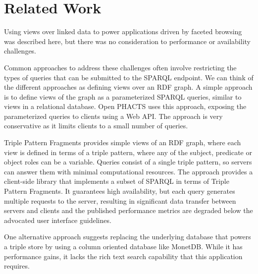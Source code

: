 \vspace{-0.2cm}
\section{Related Work}
\label{sec:related-work}

Using views over linked data to power applications driven by faceted browsing was described here\cite{erling2009faceted}, but there was no consideration to performance or availability challenges. 

Common approaches to address these challenges often involve restricting the types of queries that can be submitted to the SPARQL endpoint.
We can think of the different approaches as defining views over an RDF graph.
A simple approach is to define views of the graph as a parameterized SPARQL queries, similar to views in a relational database.
Open PHACTS\cite{Loizou_Angles_Groth_2014} uses this approach, exposing the parameterized queries to clients using a Web API.
The approach is very conservative as it limits clients to a small number of queries.

Triple Pattern Fragments \cite{Verborgh2014} provides simple views of an RDF graph, where each view is defined in terms of a triple pattern, where any of the subject, predicate or object roles can be a variable.
Queries consist of a single triple pattern, so servers can answer them with minimal computational resources.
The approach provides a client-side library that implements a subset of SPARQL in terms of Triple Pattern Fragments.
It guarantees high availability, but each query generates multiple requests to the server, resulting in significant data transfer between servers and clients and the published performance metrics are degraded below the advocated user interface guidelines. 

One alternative approach suggests replacing the underlying database that powers a triple store by using a column oriented database like MonetDB\cite{Wang_Wang_Du_Feng_2010}.   While it has performance gains, it lacks the rich text search capability that this application requires.